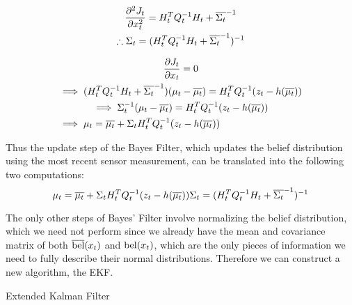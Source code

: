 \begin{multline*}
\frac{\partial^2 J_t}{\partial x_t^2} = H_t^T Q_t^{-1} H_t + \overline{\Sigma_t}^{-1} \\
\therefore \Sigma_t = (H_t^T Q_t^{-1} H_t + \overline{\Sigma_t}^{-1})^{-1} \hfill
\end{multline*}

\begin{multline*}
\frac{\partial J_t}{\partial x_t} = 0 \\
\implies (H_t^T Q_t^{-1} H_t + \overline{\Sigma_t}^{-1}) (\mu_t - \overline{\mu_t}) = H_t^TQ_t^{-1}(z_t - h(\overline{\mu_t})) \\
\implies \Sigma_t^{-1} (\mu_t - \overline{\mu_t}) = H_t^TQ_t^{-1}(z_t - h(\overline{\mu_t})) \\
\implies \mu_t = \overline{\mu_t} + \Sigma_t H_t^TQ_t^{-1}(z_t - h(\overline{\mu_t})) \hfill
\end{multline*}

Thus the update step of the Bayes Filter, which updates the belief distribution using the most recent sensor measurement, can be translated into the following two computations:
\[
\mu_t = \overline{\mu_t} + \Sigma_t H_t^TQ_t^{-1}(z_t - h(\overline{\mu_t})) \\
\Sigma_t = (H_t^T Q_t^{-1} H_t + \overline{\Sigma_t}^{-1})^{-1}
\]

The only other steps of Bayes' Filter involve normalizing the belief distribution, which we need not perform since we already have the mean and covariance matrix of both \(\overline{\mathrm{bel}}(x_t)\) and \(\mathrm{bel}(x_t)\), which are the only pieces of information we need to fully describe their normal distributions. Therefore we can construct a new algorithm, the EKF.
\begin{algorithm} 
	\caption{Extended Kalman Filter}
	\label{alg:EKFnonOptimal}
	\begin{algorithmic}[1]
		\State {}
		\EndFunction
	\end{algorithmic}
\end{algorithm}

